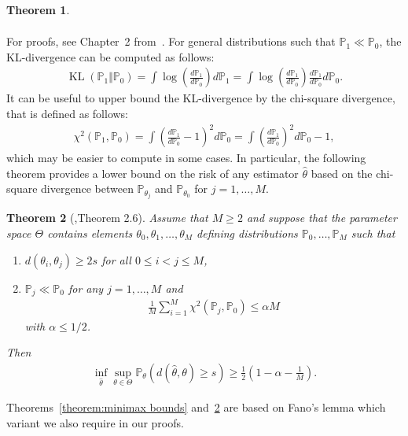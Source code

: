\documentclass[11pt]{article}
\newcommand{\bbP}{\mathbb{P}}
\newcommand{\KL}[2]{\operatorname{KL}\left (#1\Vert #2 \right )}
\newcommand{\<}{\langle}
\renewcommand{\>}{\rangle}
\theoremstyle{plain}
\newtheorem{theorem}{Theorem}
\theoremstyle{definition}
\theoremstyle{remark}
\begin{document}
{\begin{theorem}
\begin{align*}
    \end{align*}
\end{theorem}
For proofs, see Chapter~2 from~\citep{tsybakov_introduction_2009}.
For general distributions such that $\bbP_1 \ll \bbP_0$, the KL-divergence can be computed as follows:
\begin{align*}
    \KL{\bbP_1}{\bbP_0} = \int \log \left ( \frac{d \bbP_1}{d \bbP_0} \right ) d \bbP_1 = \int \log \left ( \frac{d \bbP_1}{d \bbP_0} \right ) \frac{d \bbP_1}{d \bbP_0} d \bbP_0.
\end{align*}
It can be useful to upper bound the KL-divergence by the chi-square divergence, that is defined as follows:
\begin{align*}
    \chi^2(\bbP_1, \bbP_0) = \int \left ( \frac{d \bbP_1}{d \bbP_0} - 1 \right )^2 d \bbP_0 = \int \left ( \frac{d \bbP_1}{d \bbP_0} \right )^2 d \bbP_0 - 1,
\end{align*}
which may be easier to compute in some cases. In particular, the following theorem provides a lower bound on the risk of any estimator $\widehat{\theta}$ based on the chi-square divergence between $\bbP_{\theta_j}$ and $\bbP_{\theta_0}$ for $j = 1, \ldots, M$.

\begin{theorem}[\citep{tsybakov_introduction_2009},Theorem 2.6]
\label{theorem: chi-square lower bound} Assume that $M \ge 2$ and suppose that the parameter space $\Theta$ contains elements $\theta_0, \theta_1, \ldots, \theta_M$ defining distributions $\bbP_0, \ldots, \bbP_M$ such that
\begin{enumerate}
    \item $d(\theta_i, \theta_j) \ge 2 s$ for all $0 \le i < j \le M$,
    \item $\bbP_j \ll \bbP_0$ for any $j = 1, \ldots, M$ and
    \begin{align*}
        \frac{1}{M} \sum_{i = 1}^M \chi^2(\bbP_j, \bbP_0) \le \alpha M
    \end{align*}
    with $\alpha \le 1/2$. 
\end{enumerate}
Then
\begin{align*}
    \inf_{\widehat{\theta}} \sup_{\theta \in \Theta} \bbP_{\theta}(d(\widehat{\theta}, \theta) \ge s) \ge \frac{1}{2} \left (1 - \alpha - \frac{1}{M} \right ).
\end{align*}
\end{theorem}

Theorems~\ref{theorem:minimax bounds} and~\ref{theorem: chi-square lower bound} are based on Fano's lemma which variant we also require in our proofs. 

}
\end{document}
